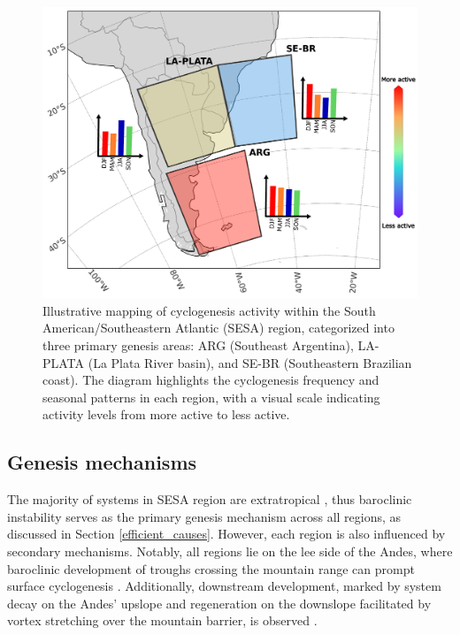 \begin{figure}[h!]
\begin{center}
\setcaptionmargin{1cm}
\includegraphics[width=0.9\columnwidth,angle=0]{fig/genesis_regions.pdf}
\caption[Cyclogenesis Regions in the South Atlantic]{Illustrative mapping of cyclogenesis activity within the South American/Southeastern Atlantic (SESA) region, categorized into three primary genesis areas: ARG (Southeast Argentina), LA-PLATA (La Plata River basin), and SE-BR (Southeastern Brazilian coast). The diagram highlights the cyclogenesis frequency and seasonal patterns in each region, with a visual scale indicating activity levels from more active to less active.}
\label{genesis_regions}
\end{center}
\end{figure}


\subsection{Genesis mechanisms}\label{genesis_mechanisms}

The majority of systems in SESA region are extratropical \citep{marrafon2022classificaccao}, thus baroclinic instability serves as the primary genesis mechanism across all regions, as discussed in Section \ref{efficient_causes}. However, each region is also influenced by secondary mechanisms. Notably, all regions lie on the lee side of the Andes, where baroclinic development of troughs crossing the mountain range can prompt surface cyclogenesis \citep{gan1994influence,vera2002cold,hoskins2005new,gramcianinov2019properties}. Additionally, downstream development, marked by system decay on the Andes' upslope and regeneration on the downslope facilitated by vortex stretching over the mountain barrier, is observed \citep{hoskins2005new}. 

